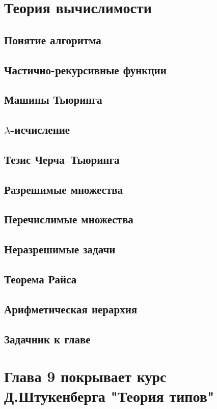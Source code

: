 \documentclass[12pt,a4paper,oneside,openany]{book}
\theoremstyle{definition}
\theoremstyle{plain}
\theoremstyle{remark}
\begin{document}
\chapter{Теория вычислимости}

\section{Понятие алгоритма}
\section{Частично-рекурсивные функции}
\section{Машины Тьюринга}
\section{\texorpdfstring{$\lambda$}{lambda}-исчисление}
\section{Тезис Черча--Тьюринга}
\section{Разрешимые множества}
\section{Перечислимые множества}
\section{Неразрешимые задачи}
\section{Теорема Райса}
\section{Арифметическая иерархия}

\section{Задачник к главе}


\chapter*{Глава 9 покрывает курс Д.Штукенберга "Теория типов"}
\end{document}
